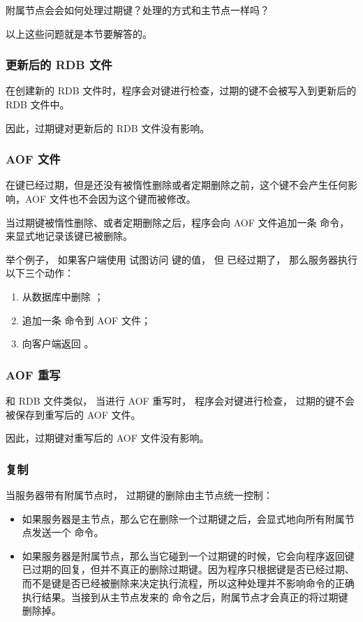 \documentclass[a4paper,11pt,english]{sphinxmanual}
\begin{document}
附属节点会会如何处理过期键？处理的方式和主节点一样吗？

以上这些问题就是本节要解答的。


\subsubsection{更新后的 RDB 文件}
\label{internal/db:rdb}
在创建新的 RDB 文件时，程序会对键进行检查，过期的键不会被写入到更新后的 RDB 文件中。

因此，过期键对更新后的 RDB 文件没有影响。


\subsubsection{AOF 文件}
\label{internal/db:aof}
在键已经过期，但是还没有被惰性删除或者定期删除之前，这个键不会产生任何影响，AOF 文件也不会因为这个键而被修改。

当过期键被惰性删除、或者定期删除之后，程序会向 AOF 文件追加一条  命令，来显式地记录该键已被删除。

举个例子，
如果客户端使用  试图访问  键的值，
但  已经过期了，
那么服务器执行以下三个动作：
\begin{enumerate}
\item {} 
从数据库中删除  ；

\item {} 
追加一条  命令到 AOF 文件；

\item {} 
向客户端返回  。

\end{enumerate}


\subsubsection{AOF 重写}
\label{internal/db:id21}
和 RDB 文件类似，
当进行 AOF 重写时，
程序会对键进行检查，
过期的键不会被保存到重写后的 AOF 文件。

因此，过期键对重写后的 AOF 文件没有影响。


\subsubsection{复制}
\label{internal/db:id22}
当服务器带有附属节点时，
过期键的删除由主节点统一控制：
\begin{itemize}
\item {} 
如果服务器是主节点，那么它在删除一个过期键之后，会显式地向所有附属节点发送一个  命令。

\item {} 
如果服务器是附属节点，那么当它碰到一个过期键的时候，它会向程序返回键已过期的回复，但并不真正的删除过期键。因为程序只根据键是否已经过期、而不是键是否已经被删除来决定执行流程，所以这种处理并不影响命令的正确执行结果。当接到从主节点发来的  命令之后，附属节点才会真正的将过期键删除掉。

\end{itemize}
\end{document}
